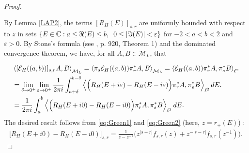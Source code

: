 \documentclass[12pt,oneside,onecolumn,open]{article}
\begin{document}
\begin{proof}
\label{teo:stone}

By Lemma \ref{LAP2}, the terms $[R_{H}(E)]_{s,r}$ are uniformly bounded with respect to $z$ in sets $ \{ E\in \mathbb{C}: a \leq \Re(E)\leq b, \hspace{0.2cm}  0 \leq   |\Im(E)|<\varepsilon \}$ for $-2<a<b<2$ and $\varepsilon >0$. By Stone's formula (see \cite{MR1009163}, p. 920, Theorem 1) and the dominated convergence theorem, we have, for all $A, B\in \mathcal{M}_L$, that

\begin{align}
 &\left<[ \mathcal{E}_{H}((a,b))  ]_{s,r}A,B\right>_{\mathcal{M}_{L}}=\left<\pi _s\mathcal{E}_{H}((a,b))\pi _r^{*}A,B\right>_{\mathcal{M}_{L}}= \left<\mathcal{E}_{H}((a,b))\pi _r^{*}A, \pi _s^{*}B\right>_{\ell ^{2}} \\\notag &=\lim _{\delta \to 0^{+}}   \lim _{\varepsilon \to 0^{+}}  \frac{1}{2\pi i}\int _{a+\delta }^{b-\delta } \left< \Big ( R_{H}(E +i\varepsilon )  -R_{H}(E -i\varepsilon )  \Big )\pi _r^{*}A, \pi _s^{*}B\right>_{\ell ^{2}} dE.  
 \\ \notag & =    \frac{1}{2\pi i}\int _{a }^{b } \left< \Big ( R_{H}(E +i 0 )  -R_{H}(E -i 0 )  \Big )\pi _r^{*}A, \pi _s^{*}B\right>_{\ell ^{2}} dE. 
  \end{align}
The desired result follows from \eqref{eq:Green1} and \eqref{eq:Green2} (here, $  z = r_+(E) $) :
\begin{align}
\Big [ R_{H}(E +i 0 )  -R_{H}(E -i 0 ) \Big ]_{s, r}= 
    \frac{ 1 }{ z - z^{-1} }  \Big ( z^{|s-r|} f_{s, r}(z)  + z^{-|s-r|} f_{s, r}(z^{-1}) \Big )  .
    \end{align}


  


\end{proof}
\end{document}
